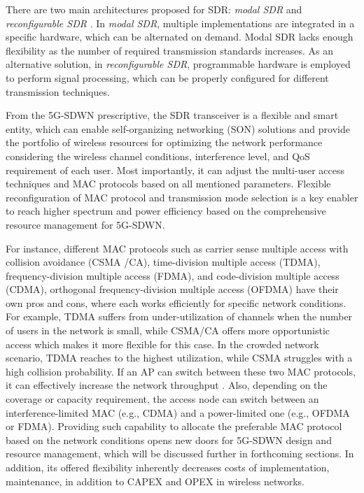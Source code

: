 \documentclass[conference]{IEEEtran}
\begin{document}
There are two main architectures proposed for SDR: \textit{modal SDR} and \textit{reconfigurable SDR} \cite{7039225}. In \textit{modal SDR}, multiple implementations are integrated in a specific hardware, which can be alternated on demand. Modal SDR lacks enough flexibility as the number of required transmission standards increases. As an alternative solution, in \textit{reconfigurable SDR}, programmable hardware is employed to perform signal processing, which can be properly configured for different transmission techniques.

From the 5G-SDWN prescriptive, the SDR transceiver is a flexible and smart entity, which can enable self-organizing networking (SON) solutions and provide the portfolio of wireless resources for optimizing the network performance considering the wireless channel conditions, interference level, and QoS requirement of each user. Most importantly, it can adjust the multi-user access techniques and MAC protocols based on all mentioned parameters. Flexible reconfiguration of MAC protocol and transmission mode selection is a key enabler to reach higher spectrum and power efficiency based on the comprehensive resource management for 5G-SDWN.

For instance, different MAC protocols such as carrier sense multiple access with collision avoidance (CSMA /CA), time-division multiple access (TDMA), frequency-division multiple access (FDMA), and code-division multiple access (CDMA), orthogonal frequency-division multiple access (OFDMA) have their own pros and cons, where each works efficiently for specific network conditions. For example, TDMA suffers from under-utilization of channels when the number of users in the network is small, while CSMA/CA offers more opportunistic access which makes it more flexible for this case. In the crowded network scenario, TDMA reaches to the highest utilization, while CSMA struggles with a high collision probability. If an AP can switch between these two MAC protocols, it can effectively increase the network throughput \cite{Atoosa2015}. Also, depending on the coverage or capacity requirement, the access node can switch between an interference-limited MAC (e.g., CDMA) and a power-limited one (e.g., OFDMA or FDMA). Providing such capability to allocate the preferable MAC protocol based on the network conditions opens new doors for 5G-SDWN design and resource management, which will be discussed further in forthcoming sections. In addition, its offered flexibility inherently decreases costs of implementation, maintenance, in addition to CAPEX and OPEX in wireless networks. 
\end{document}
